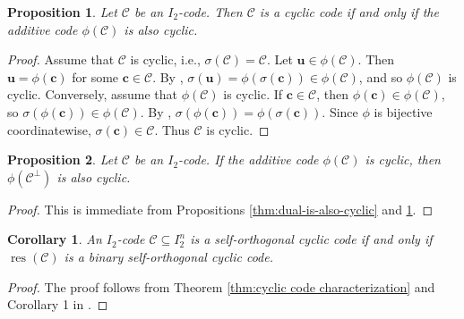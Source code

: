 \documentclass[12pt]{article}
\newtheorem{proposition}[proposition]{Proposition}
\newtheorem{corollary}[corollary]{Corollary}
\theoremstyle{definition}
\theoremstyle{plain}
\newcommand{\Blue}[1]{{ \color{blue} #1}}
\begin{document}
\begin{proposition}  \label{thm:add-code-is-also-cyclic}
Let $\mathcal{C}$ be an $I_2$-code. Then $\mathcal{C}$ is a cyclic code if and only if the additive code $\phi ( \mathcal{C} )$ is also cyclic.
\end{proposition}

\begin{proof}
Assume that $\mathcal{C}$ is cyclic, i.e., $\sigma(\mathcal{C}) = \mathcal{C}$. Let $\mathbf{u} \in \phi(\mathcal{C})$. Then $\mathbf{u} = \phi(\mathbf{c})$ for some $\mathbf{c} \in \mathcal{C}$. By  , $\sigma(\mathbf{u}) = \phi(\sigma(\mathbf{c})) \in \phi(\mathcal{C})$, and so $\phi(\mathcal{C})$ is cyclic.  Conversely, assume that $\phi(\mathcal{C})$ is cyclic. If $\mathbf{c} \in \mathcal{C}$, then $\phi(\mathbf{c}) \in \phi(\mathcal{C})$, so $\sigma (\phi(\mathbf{c})) \in \phi(\mathcal{C})$. By , $\sigma (\phi (\mathbf{c})) = \phi(\sigma(\mathbf{c}))$. Since $\phi$ is bijective coordinatewise, $\sigma(\mathbf{c}) \in \mathcal{C}$. Thus $\mathcal{C}$ is cyclic.
\end{proof}




\begin{proposition}
Let $\mathcal{C}$ be an $I_2$-code. If the additive code $\phi ( \mathcal{C} )$ is cyclic, then $\phi ( \mathcal{C}^\perp )$ is also cyclic.
\end{proposition}

\begin{proof}
This is immediate from Propositions \ref{thm:dual-is-also-cyclic} and \ref{thm:add-code-is-also-cyclic}.
\end{proof}






\begin{corollary}
An  $I_2$-code $\mathcal{C} \subseteq  I_2^n$ is a self-orthogonal cyclic code if and only if $\operatorname{res}(\mathcal{C}) $ is a binary self-orthogonal cyclic code.
\end{corollary}

\begin{proof}
The proof follows from Theorem \ref{thm:cyclic code characterization} and Corollary 1 in \cite{Duality_I2E2H2}.
\end{proof}
\end{document}
